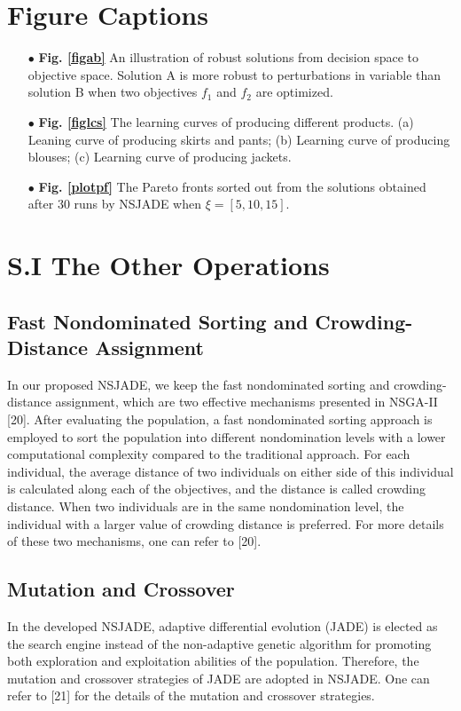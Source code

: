 \documentclass[journal]{IEEEtran}
\theoremstyle{definition}
\begin{document}

\section*{Figure Captions}
\begin{itemize}
\item[$\bullet$] \textbf{Fig. \ref{figab}} An illustration of robust solutions from decision space to objective space. Solution A is more robust to perturbations in variable than solution B when two objectives $f_1$ and $f_2$ are optimized.
\item[$\bullet$] \textbf{Fig. \ref{figlcs}} The learning curves of producing different products. (a) Leaning curve of producing skirts and pants; (b) Learning curve of producing blouses; (c) Learning curve of producing jackets.
\item[$\bullet$] \textbf{Fig. \ref{plotpf}} The Pareto fronts sorted out from the solutions obtained after 30 runs by NSJADE when $\xi=[5, 10, 15]$.
\end{itemize}


\clearpage


\section*{S.I The Other Operations}
\subsection{Fast Nondominated Sorting and Crowding-Distance Assignment}
In our proposed NSJADE, we keep the fast nondominated sorting and crowding-distance assignment, which are two effective mechanisms presented in NSGA-II [20]. After evaluating the population, a fast nondominated sorting approach is employed to sort the population into different nondomination levels with a lower computational complexity compared to the traditional approach. For each individual, the average distance of two individuals on either side of this individual is calculated along each of the objectives, and the distance is called crowding distance. When two individuals are in the same nondomination level, the individual with a larger value of crowding distance is preferred. For more details of these two mechanisms, one can refer to [20].

\subsection{Mutation and Crossover}
In the developed NSJADE, adaptive differential evolution (JADE) is elected as the search engine instead of the non-adaptive genetic algorithm for promoting both exploration and exploitation abilities of the population. Therefore, the mutation and crossover strategies of JADE are adopted in NSJADE. One can refer to [21] for the details of the mutation and crossover strategies.
\end{document}
